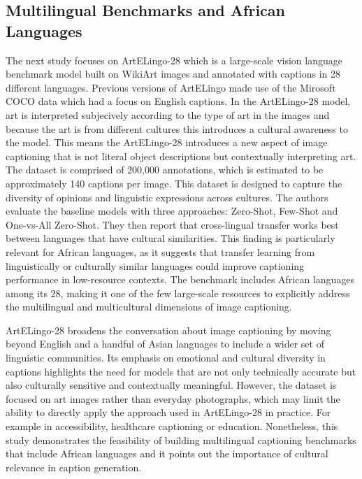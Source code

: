 \documentclass{article}
\begin{document}
\subsection{ Multilingual Benchmarks and African Languages}
The next study focuses on ArtELingo-28 which is a large-scale vision language benchmark model built on WikiArt images and annotated with captions in 28 different languages. Previous versions of ArtELingo made use of the Mirosoft COCO data which had a focus on English captions. In the  ArtELingo-28 model, art is interpreted subjecively according to the type of art in the images and because the art is from different cultures this introduces a cultural awareness to the model. This means the ArtELingo-28 introduces a new aspect of image captioning that is not literal object descriptions but contextually interpreting art. The dataset is comprised of 200,000 annotations, which is estimated to be approximately 140 captions per image. This dataset is designed to capture the diversity of opinions and linguistic expressions across cultures. The authors evaluate the baseline models with three approaches: Zero-Shot, Few-Shot and One-vs-All Zero-Shot. They then report that cross-lingual transfer works best between languages that have cultural similarities. This finding is particularly relevant for African languages, as it suggests that transfer learning from linguistically or culturally similar languages could improve captioning performance in low-resource contexts. The benchmark includes African languages among its 28, making it one of the few large-scale resources to explicitly address the multilingual and multicultural dimensions of image captioning\cite{mohamed2024no}.

ArtELingo-28 broadens the conversation about image captioning by moving beyond English and a handful of Asian languages to include a wider set of linguistic communities. Its emphasis on emotional and cultural diversity in captions highlights the need for models that are not only technically accurate but also culturally sensitive and contextually meaningful. However, the dataset is focused on art images rather than everyday photographs, which may limit the ability to directly apply the approach used in ArtELingo-28 in practice. For example in accessibility, healthcare captioning or education. Nonetheless, this study demonstrates the feasibility of building multilingual captioning benchmarks that include African languages and it points out the importance of cultural relevance in caption generation.
\end{document}
